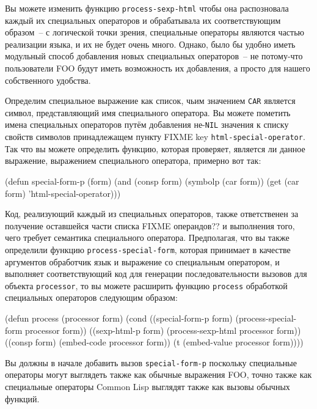 Вы можете изменить функцию \lstinline{process-sexp-html} чтобы она распозновала каждый их
специальных операторов и обрабатывала их соответствующим образом~-- с логической точки
зрения, специальные операторы являются частью реализации языка, и их не будет очень
много. Однако, было бы удобно иметь модульный способ добавления новых специальных
операторов~-- не потому-что пользователи FOO будут иметь возможность их добавления, а
просто для нашего собственного удобства.

Определим специальное выражение как список, чьим значением \lstinline{CAR} является символ,
представляющий имя специального оператора.  Вы можете пометить имена специальных
операторов путём добавления не-\lstinline{NIL} значения к списку свойств символов принадлежащем
пункту FIXME key \lstinline{html-special-operator}.  Так что вы можете определить функцию,
которая проверяет, является ли данное выражение, выражением специального оператора,
примерно вот так:

\begin{myverb}
(defun special-form-p (form)
  (and (consp form) (symbolp (car form)) (get (car form) 'html-special-operator)))
\end{myverb}

Код, реализующий каждый из специальных операторов, также ответственен за получение
оставшейся части списка FIXME операндов?? и выполнения того, чего требует семантика
специального оператора.  Предполагая, что вы также определили функцию
\lstinline{process-special-form}, которая принимает в качестве аргументов обработчик язык и
выражение со специальным оператором, и выполняет соответствующий код для генерации
последовательности вызовов для объекта \lstinline{processor}, то вы можете расширить функцию
\lstinline{process} обработкой специальных операторов следующим образом:

\begin{myverb}
(defun process (processor form)
  (cond
    ((special-form-p form) (process-special-form processor form))
    ((sexp-html-p form)    (process-sexp-html processor form))
    ((consp form)          (embed-code processor form))
    (t                     (embed-value processor form))))
\end{myverb}

Вы должны в начале добавить вызов \lstinline{special-form-p} поскольку специальные операторы
могут выглядеть также как обычные выражения FOO, точно также как специальные операторы
Common Lisp выглядят также как вызовы обычных функций.

